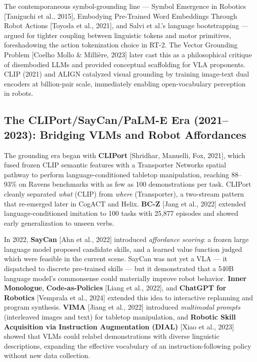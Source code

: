 The contemporaneous symbol-grounding line --- Symbol Emergence in Robotics {[}Taniguchi et al., 2015{]}, Embodying Pre-Trained Word Embeddings Through Robot Actions {[}Toyoda et al., 2021{]}, and Salvi et al.'s language bootstrapping --- argued for tighter coupling between linguistic tokens and motor primitives, foreshadowing the action tokenization choice in RT-2. The Vector Grounding Problem {[}Coelho Mollo \& Millière, 2023{]} later cast this as a philosophical critique of disembodied LLMs and provided conceptual scaffolding for VLA proponents. CLIP (2021) and ALIGN catalyzed visual grounding by training image-text dual encoders at billion-pair scale, immediately enabling open-vocabulary perception in robots.

\subsection{The CLIPort/SayCan/PaLM-E Era (2021--2023): Bridging VLMs and Robot Affordances}\label{the-cliportsaycanpalm-e-era-20212023-bridging-vlms-and-robot-affordances}

The grounding era began with \textbf{CLIPort} {[}Shridhar, Manuelli, Fox, 2021{]}, which fused frozen CLIP semantic features with a Transporter Networks spatial pathway to perform language-conditioned tabletop manipulation, reaching 88--93\% on Ravens benchmarks with as few as 100 demonstrations per task. CLIPort cleanly separated \emph{what} (CLIP) from \emph{where} (Transporter), a two-stream pattern that re-emerged later in CogACT and Helix. \textbf{BC-Z} {[}Jang et al., 2022{]} extended language-conditioned imitation to 100 tasks with 25,877 episodes and showed early generalization to unseen verbs.

In 2022, \textbf{SayCan} {[}Ahn et al., 2022{]} introduced \emph{affordance scoring}: a frozen large language model proposed candidate skills, and a learned value function judged which were feasible in the current scene. SayCan was not yet a VLA --- it dispatched to discrete pre-trained skills --- but it demonstrated that a 540B language model's commonsense could materially improve robot behavior. \textbf{Inner Monologue}, \textbf{Code-as-Policies} {[}Liang et al., 2022{]}, and \textbf{ChatGPT for Robotics} {[}Vemprala et al., 2024{]} extended this idea to interactive replanning and program synthesis. \textbf{VIMA} {[}Jiang et al., 2022{]} introduced \emph{multimodal prompts} (interleaved images and text) for tabletop manipulation, and \textbf{Robotic Skill Acquisition via Instruction Augmentation (DIAL)} {[}Xiao et al., 2023{]} showed that VLMs could relabel demonstrations with diverse linguistic descriptions, expanding the effective vocabulary of an instruction-following policy without new data collection.

